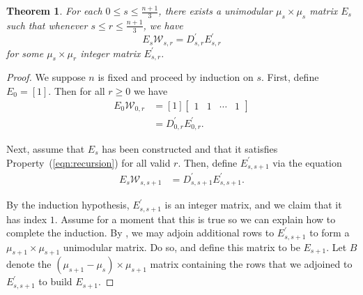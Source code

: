 \documentclass[11pt]{article}
\newtheorem{theorem}[theo]{Theorem}
\theoremstyle{definition}
\numberwithin{equation}{section}
\numberwithin{equation}{section}
\newcommand{\W}{\mathcal{W}}
\begin{document}
\begin{theorem}\label{t:bier-std}
For each $0 \leq s \leq \frac{n+1}{3}$, there exists a unimodular $\mu_s \times \mu_s$ matrix $E_{s}$ such that whenever $s \leq r \leq \frac{n+1}{3}$, we have
\begin{equation}\label{eqn:recursion}
    E_{s}\W_{s,r} = D_{s,r}^{\prime} E_{s,r}^{\prime} \tag{*}
\end{equation}
for some $\mu_{s} \times \mu_{r}$ integer matrix $E_{s,r}^{\prime}$.
\end{theorem}
\begin{proof}
We suppose $n$ is fixed and proceed by induction on $s$.  First, define $E_{0} = [1]$.  Then for all $r \geq 0$ we have
\begin{align*}
E_{0}\W_{0,r} &= [1] \begin{bmatrix} 1 & 1 & \cdots & 1 \end{bmatrix}\\
&= D_{0,r}^{\prime} E_{0,r}^{\prime}.
\end{align*}

Next, assume that $E_{s}$ has been constructed and that it satisfies Property~(\ref{eqn:recursion}) for all valid $r$.  Then, define $E_{s,s+1}^\prime$ via the equation
\begin{align} \label{eqn:index1}
    E_{s}\W_{s,s+1} &= D_{s,s+1}^{\prime} E_{s,s+1}^{\prime}.  \tag{**}
\end{align}

By the induction hypothesis, $E_{s,s+1}^{\prime}$ is an integer matrix, and we claim that it has index $1$.  Assume for a moment that this is true so we can explain how to complete the induction.  By \cite[Proposition 2]{wilson_classic}, we may adjoin additional rows to $E_{s,s+1}^{\prime}$ to form a $\mu_{s+1} \times \mu_{s+1}$ unimodular matrix.  Do so, and define this matrix to be $E_{s+1}$.  Let $B$ denote the $(\mu_{s+1}-\mu_{s}) \times \mu_{s+1}$ matrix containing the rows that we adjoined to $E_{s,s+1}^{\prime}$ to build $E_{s+1}$.  


\end{proof}
\end{document}
